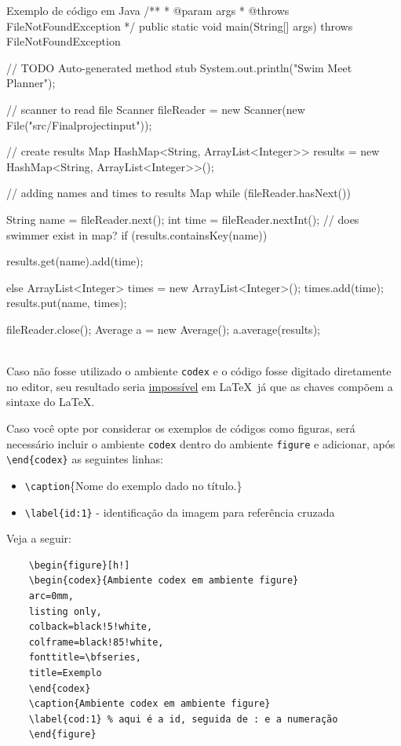 \begin{codex}{Exemplo de código em Java}
	/**
	* @param args
	* @throws FileNotFoundException
	*/
	public static void main(String[] args) throws FileNotFoundException {
		// TODO Auto-generated method stub
		System.out.println("Swim Meet Planner");
		
		// scanner to read file
		Scanner fileReader = new Scanner(new File("src/Finalprojectinput"));
		
		// create results Map
		HashMap<String, ArrayList<Integer>> results = new HashMap<String, ArrayList<Integer>>();
		
		// adding names and times to results Map
		while (fileReader.hasNext()) {
			String name = fileReader.next();
			int time = fileReader.nextInt();
			// does swimmer exist in map?
			if (results.containsKey(name)) {
				results.get(name).add(time);
				
			} else {
				ArrayList<Integer> times = new ArrayList<Integer>();
				times.add(time);
				results.put(name, times);
			}
		}
		fileReader.close();
		Average a = new Average();
		a.average(results);
	}
\end{codex}
\ \\

Caso não fosse utilizado o ambiente \verb|codex| e o código fosse digitado diretamente no editor, seu resultado seria \underline{impossível} em \LaTeX\ já que as chaves compõem a sintaxe do \LaTeX.


Caso você opte por considerar os exemplos de códigos como figuras, será necessário incluir o ambiente \verb|codex| dentro do ambiente \verb|figure| e adicionar, após \verb|\end{codex}| as seguintes linhas:

\begin{itemize}
	\item \verb|\caption|\{Nome do exemplo dado no título.\}
	\item \verb|\label{id:1}| - identificação da imagem para referência cruzada
\end{itemize}

Veja a seguir:

\begin{verbatim}
	\begin{figure}[h!]
	\begin{codex}{Ambiente codex em ambiente figure}
	arc=0mm,
	listing only,
	colback=black!5!white,
	colframe=black!85!white,
	fonttitle=\bfseries,
	title=Exemplo
	\end{codex}
	\caption{Ambiente codex em ambiente figure}
	\label{cod:1} % aqui é a id, seguida de : e a numeração
	\end{figure}
\end{verbatim}

